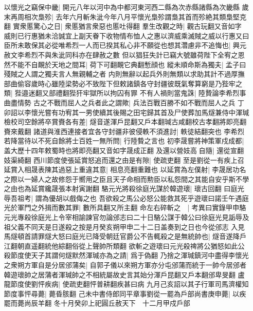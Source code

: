 以懷光之竊保中畿|{
	開元八年以河中為中都河東河西二縣為次赤縣諸縣為次畿縣}
歲末再周相次梟殄|{
	去年六月斬朱泚今年八月平懷光梟殄謂梟其首而殄絶其類梟堅克翻}
實衆慝驚心之日|{
	衆慝猶言衆惡也慝吐得翻}
羣生改觀之時|{
	觀古玩翻又音如字}
威則已行惠猶未洽誠宜上副天眷下收物情布恤人之惠以濟威乘滅賊之威以行惠又曰臣所未敢保其必從唯希烈一人而已揆其私心非不願從也想其濳慮非不追悔也|{
	興元赦文李希烈不與朱泚同科亦在肆赦之數}
但以猖狂失計已竊大號雖荷陛下全宥之恩然不能不自靦於天地之間耳|{
	荷下可翻靦它典翻慙顔也}
縱未順命斯為獨夫|{
	孟子曰殘賊之人謂之獨夫言人無親輔之者}
内則無辭以起兵外則無類以求助其計不過厚撫部曲偷容歲時心雖陸梁勢必不致陛下但敕諸鎮各守封疆彼既氣奪算窮是乃狴牢之類|{
	狴邉迷翻又部禮翻狴犴牢獄所以拘囚有罪}
不有人禍則當鬼誅|{
	陸贄論李希烈事曲盡情勢}
古之不戰而屈人之兵者此之謂歟|{
	兵法百戰百勝不如不戰而屈人之兵}
丁卯詔以李懷光嘗有功宥其一男使續其後賜之田宅歸其首及尸使葬加馬燧兼侍中渾瑊檢校司空餘將卒賞賚各有差|{
	燧音遂渾戶昆翻又戶本翻瑊古咸翻校古孝翻將即亮翻賚來戴翻}
諸道與淮西連接者宜各守封疆非彼侵軼不須進討|{
	軼徒結翻突也}
李希烈若降當待以不死自餘將士百姓一無所問|{
	行陸䞇之言也}
初李晟嘗將神策軍戍成都|{
	盖大歷十四年敕蜀時也將即亮翻又音如字晟成正翻}
及還以營妓高自隨|{
	還從宣翻妓渠綺翻}
西川節度使張延賞怒追而還之由是有隙|{
	使疏吏翻}
至是劉從一有疾上召延賞入相晟表陳其過惡上重違其意|{
	相息亮翻重難也}
以延賞為左僕射|{
	李晟居功名之際以一婦人之故修怨于嚮用之臣且天子命相而勲臣以私怨間之其能自安乎斯不學之由也為延賞纔晟張本射寅謝翻}
駱元光將殺徐庭光謀於韓遊瓌|{
	瓌古回翻}
曰庭光辱吾祖考|{
	謂為優胡以戲侮之也}
吾欲殺之馬公必怒公能救其死乎遊瓌曰諾壬午遇庭光於軍門之外揖而數其罪|{
	數所具翻又所主翻}
命左右碎斬之　|{
	考異曰實錄甲申駱元光專殺徐庭光上令宰相諭諫官勿論邠志曰二十日駱公謀于韓公曰徐庭光見詬辱及祖父義不同天是日遂殺之按是月癸亥朔甲申二十二日盖奏到之日也今從邠志}
入見馬燧頓首請罪燧大怒曰庭光已降受朝廷官爵公不告輒殺之是無統帥也|{
	燧音遂降戶江翻朝直遥翻統他綜翻俗從上聲帥所類翻}
欲斬之遊瓌曰元光殺禆將公猶怒如此公殺節度使天子其謂何燧默然渾瑊亦為之請|{
	爲于偽翻}
乃捨之渾瑊鎮河中盡得李懷光之衆朔方軍自是分居邠蒲矣|{
	自郭子儀以來朔方軍亦分屯邠蒲而統于一帥今居邠者韓遊瓌帥之居蒲者渾瑊帥之不相統屬故史言其始分渾戶昆翻又戶本翻邠卑旻翻}
盧龍節度使劉怦疾病|{
	使疏吏翻怦普耕翻疾甚曰病}
九月己亥詔以其子行軍司馬濟權知節度事怦尋薨|{
	薨昏胲翻}
己未中書侍郎同平章事劉從一罷為戶部尚書庚申薨|{
	以疾罷而薨尚辰羊翻}
冬十月癸卯上祀圓丘赦天下　十二月甲戍戶部

